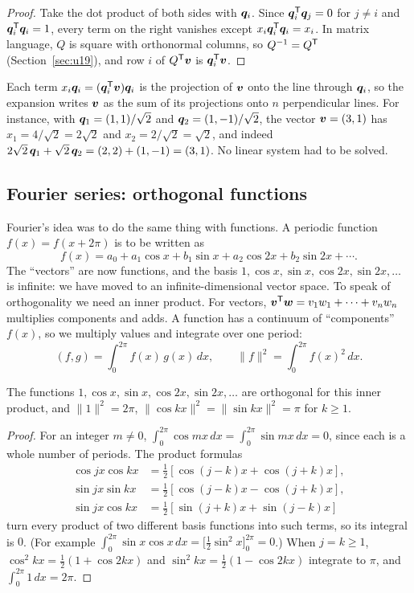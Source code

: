 \begin{proof}
Take the dot product of both sides with $\boldsymbol{q}_i$. Since $\boldsymbol{q}_i^{\mathsf{T}}\boldsymbol{q}_j=0$ for $j\neq i$
and $\boldsymbol{q}_i^{\mathsf{T}}\boldsymbol{q}_i=1$, every term on the right vanishes except
$x_i\boldsymbol{q}_i^{\mathsf{T}}\boldsymbol{q}_i=x_i$. In matrix language, $Q$ is square with orthonormal columns, so
$Q^{-1}=Q^{\mathsf{T}}$ (Section~\ref{sec:u19}), and row $i$ of $Q^{\mathsf{T}}\boldsymbol{v}$ is $\boldsymbol{q}_i^{\mathsf{T}}\boldsymbol{v}$.
\end{proof}

Each term $x_i\boldsymbol{q}_i=(\boldsymbol{q}_i^{\mathsf{T}}\boldsymbol{v})\boldsymbol{q}_i$ is the projection of $\boldsymbol{v}$ onto the line
through $\boldsymbol{q}_i$, so the expansion writes $\boldsymbol{v}$ as the sum of its projections onto $n$
perpendicular lines. For instance, with $\boldsymbol{q}_1=(1,1)/\sqrt2$ and $\boldsymbol{q}_2=(1,-1)/\sqrt2$,
the vector $\boldsymbol{v}=(3,1)$ has $x_1=4/\sqrt2=2\sqrt2$ and $x_2=2/\sqrt2=\sqrt2$, and indeed
$2\sqrt2\,\boldsymbol{q}_1+\sqrt2\,\boldsymbol{q}_2=(2,2)+(1,-1)=(3,1)$. No linear system had to be solved.

\subsection{Fourier series: orthogonal functions}

Fourier's idea was to do the same thing with functions. A periodic function
$f(x)=f(x+2\pi)$ is to be written as
\[
  f(x)=a_0+a_1\cos x+b_1\sin x+a_2\cos2x+b_2\sin2x+\cdots .
\]
The ``vectors'' are now functions, and the basis $1,\cos x,\sin x,\cos2x,\sin2x,\dots$ is
infinite: we have moved to an infinite-dimensional vector space. To speak of orthogonality
we need an inner product. For vectors, $\boldsymbol{v}^{\mathsf{T}}\boldsymbol{w}=v_1w_1+\dots+v_nw_n$ multiplies
components and adds. A function has a continuum of ``components'' $f(x)$, so we multiply
values and integrate over one period:
\[
  (f,g)=\int_{0}^{2\pi}f(x)\,g(x)\,dx,\qquad \|f\|^{2}=\int_{0}^{2\pi}f(x)^{2}\,dx .
\]

\begin{proposition}\label{prop:u26-orth}
The functions $1,\cos x,\sin x,\cos2x,\sin2x,\dots$ are orthogonal for this inner product,
and $\|1\|^{2}=2\pi$, $\|\cos kx\|^{2}=\|\sin kx\|^{2}=\pi$ for $k\ge1$.
\end{proposition}

\begin{proof}
For an integer $m\neq0$, $\int_0^{2\pi}\cos mx\,dx=\int_0^{2\pi}\sin mx\,dx=0$, since each is
a whole number of periods. The product formulas
\begin{align*}
  \cos jx\cos kx&=\tfrac12[\cos(j-k)x+\cos(j+k)x],\\
  \sin jx\sin kx&=\tfrac12[\cos(j-k)x-\cos(j+k)x],\\
  \sin jx\cos kx&=\tfrac12[\sin(j+k)x+\sin(j-k)x]
\end{align*}
turn every product of two different basis functions into such terms, so its integral is
$0$. (For example $\int_0^{2\pi}\sin x\cos x\,dx=\bigl[\tfrac12\sin^{2}x\bigr]_0^{2\pi}=0$.) When
$j=k\ge1$, $\cos^{2}kx=\tfrac12(1+\cos2kx)$ and $\sin^{2}kx=\tfrac12(1-\cos2kx)$ integrate to
$\pi$, and $\int_0^{2\pi}1\,dx=2\pi$.
\end{proof}

